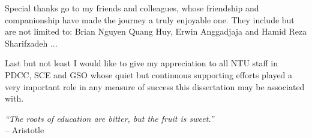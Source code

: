 Special thanks go to my friends and colleagues, whose friendship and companionship have made the journey a truly enjoyable one. 
They include but are not limited to: Brian Nguyen Quang Huy, Erwin Anggadjaja and Hamid Reza Sharifzadeh ...

Last but not least I would like to give my appreciation to all NTU staff in PDCC, SCE and GSO whose quiet but continuous supporting efforts played a very important role in any measure of success this dissertation may be associated with.

\begin{flushright}
	\parbox[t]{1\textwidth}{%
	\begin{flushright}
		\emph{{}``The roots of education are bitter, but the fruit is sweet.''}\\
		\emph{--} Aristotle\\
	\par\end{flushright}%
	}	
\par\end{flushright}


